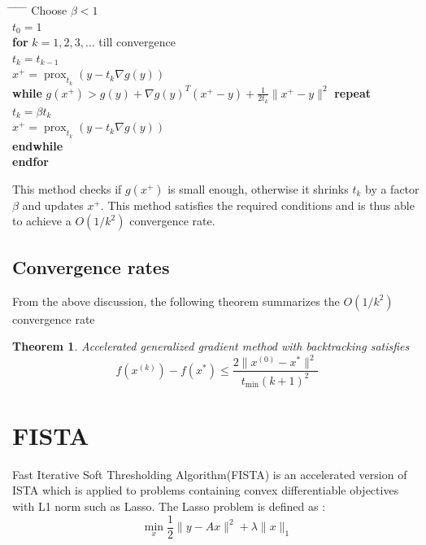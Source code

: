 \documentclass[twoside]{article}
\newcounter{lecnum}
\newtheorem{theorem}{Theorem}[lecnum]
\begin{document}
\begin{tabbing}
\hspace*{.25in} \= \hspace*{.25in} \= \hspace*{.25in} \= \hspace*{.25in} \= \hspace*{.25in} \=\kill
\> Choose $\beta<1$ \\
\> $t_0=1$\\
\> {\bf for} $k = 1,2,3,\dotsc$ till convergence \\
\>\> $t_k=t_{k-1}$ \\
\>\> $x^+ = \operatorname{prox}_{t_k}(y-t_k\nabla g(y))$ \\
\>\> {\bf while} $	g(x^+) > g(y) + \nabla g(y)^T(x^+-y) + \frac{1}{2t_k}\lVert x^+ - y\rVert^2$ {\bf repeat} \\
\>\>\> $t_k = \beta t_k$ \\
\>\>\> $x^+ = \operatorname{prox}_{t_k}(y-t_k\nabla g(y))$ \\
\>\> {\bf endwhile}\\
\> {\bf endfor}
\end{tabbing}

This method checks if $g(x^+)$ is small enough, otherwise it shrinks $t_k$ by a factor $\beta$ and updates $x^+$. This method satisfies the required conditions and is thus able to achieve a $O(1/k^2)$ convergence rate. 

\subsection{Convergence rates}

From the above discussion, the following theorem summarizes the $O(1/k^2)$ convergence rate

\begin{theorem}
Accelerated generalized gradient method with backtracking satisfies 
\[
f(x^{(k)}) - f(x^*) \leq \frac{2\lVert x^{(0)} - x^* \rVert^2}{t_{\min}(k+1)^2}
\]
\end{theorem}


\section{FISTA}
Fast Iterative Soft Thresholding Algorithm(FISTA) is an accelerated version of ISTA which is applied to problems containing convex differentiable objectives with L1 norm such as Lasso. The Lasso problem is defined as : 
\[
	\min_{x} \frac{1}{2}\lVert y-Ax \rVert^2 + \lambda\lVert x \rVert_1
\]
\end{document}
